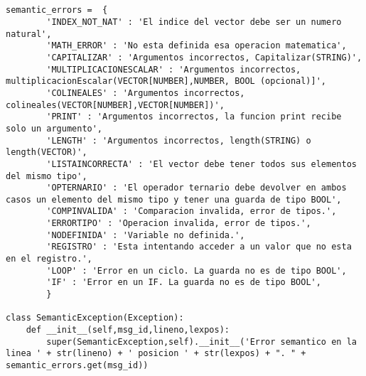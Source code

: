 \begin{verbatim}


semantic_errors =  {
        'INDEX_NOT_NAT' : 'El indice del vector debe ser un numero natural',
        'MATH_ERROR' : 'No esta definida esa operacion matematica',
        'CAPITALIZAR' : 'Argumentos incorrectos, Capitalizar(STRING)',
        'MULTIPLICACIONESCALAR' : 'Argumentos incorrectos, multiplicacionEscalar(VECTOR[NUMBER],NUMBER, BOOL (opcional)]',
        'COLINEALES' : 'Argumentos incorrectos, colineales(VECTOR[NUMBER],VECTOR[NUMBER])',
        'PRINT' : 'Argumentos incorrectos, la funcion print recibe solo un argumento',
        'LENGTH' : 'Argumentos incorrectos, length(STRING) o length(VECTOR)',
        'LISTAINCORRECTA' : 'El vector debe tener todos sus elementos del mismo tipo',
        'OPTERNARIO' : 'El operador ternario debe devolver en ambos casos un elemento del mismo tipo y tener una guarda de tipo BOOL',
        'COMPINVALIDA' : 'Comparacion invalida, error de tipos.',
        'ERRORTIPO' : 'Operacion invalida, error de tipos.',
        'NODEFINIDA' : 'Variable no definida.',
        'REGISTRO' : 'Esta intentando acceder a un valor que no esta en el registro.',
        'LOOP' : 'Error en un ciclo. La guarda no es de tipo BOOL',
        'IF' : 'Error en un IF. La guarda no es de tipo BOOL',
        }

class SemanticException(Exception):
    def __init__(self,msg_id,lineno,lexpos):
        super(SemanticException,self).__init__('Error semantico en la linea ' + str(lineno) + ' posicion ' + str(lexpos) + ". " + semantic_errors.get(msg_id))

\end{verbatim}